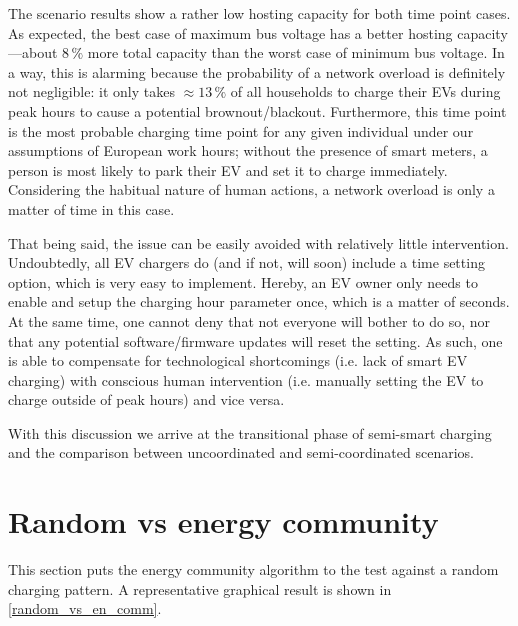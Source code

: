 \documentclass[a4paper,10pt]{report}
\begin{document}
The scenario results show a rather low hosting capacity for both time point cases. As expected, the best case of maximum bus voltage has a better hosting capacity---about $8\,\%$ more total capacity than the worst case of minimum bus voltage. In a way, this is alarming because the probability of a network overload is definitely not negligible: it only takes $\approx13\,\%$ of all households to charge their EVs during peak hours to cause a potential brownout/blackout. Furthermore, this time point is the most probable charging time point for any given individual under our assumptions of European work hours; without the presence of smart meters, a person is most likely to park their EV and set it to charge immediately. Considering the habitual nature of human actions, a network overload is only a matter of time in this case.

That being said, the issue can be easily avoided with relatively little intervention. Undoubtedly, all EV chargers do (and if not, will soon) include a time setting option, which is very easy to implement. Hereby, an EV owner only needs to enable and setup the charging hour parameter once, which is a matter of seconds. At the same time, one cannot deny that not everyone will bother to do so, nor that any potential software/firmware updates will reset the setting. As such, one is able to compensate for technological shortcomings (i.e. lack of smart EV charging) with conscious human intervention (i.e. manually setting the EV to charge outside of peak hours) and vice versa.

With this discussion we arrive at the transitional phase of semi-smart charging and the comparison between uncoordinated and semi-coordinated scenarios.


\section{Random vs energy community}\label{section_rand_vs_comm}
This section puts the energy community algorithm to the test against a random charging pattern. A representative graphical result is shown in \cref{random_vs_en_comm}.
\end{document}
